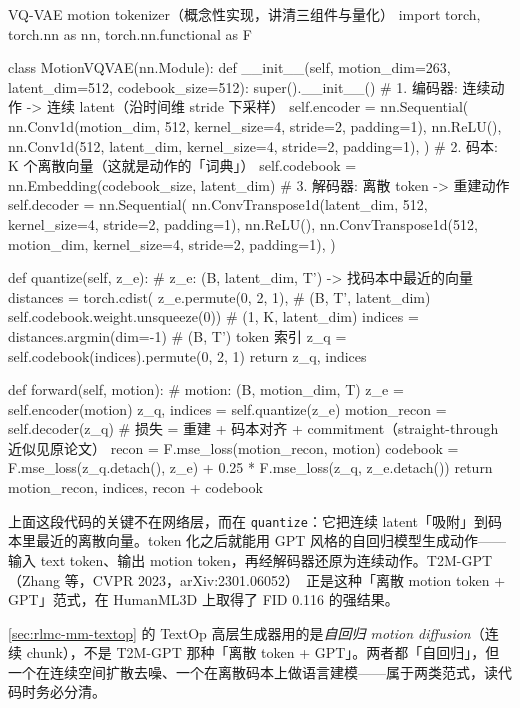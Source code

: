 \begin{codebox}[Python]{VQ-VAE motion tokenizer（概念性实现，讲清三组件与量化）}
import torch, torch.nn as nn, torch.nn.functional as F

class MotionVQVAE(nn.Module):
    def __init__(self, motion_dim=263, latent_dim=512, codebook_size=512):
        super().__init__()
        # 1. 编码器: 连续动作 -> 连续 latent（沿时间维 stride 下采样）
        self.encoder = nn.Sequential(
            nn.Conv1d(motion_dim, 512, kernel_size=4, stride=2, padding=1),
            nn.ReLU(),
            nn.Conv1d(512, latent_dim, kernel_size=4, stride=2, padding=1),
        )
        # 2. 码本: K 个离散向量（这就是动作的「词典」）
        self.codebook = nn.Embedding(codebook_size, latent_dim)
        # 3. 解码器: 离散 token -> 重建动作
        self.decoder = nn.Sequential(
            nn.ConvTranspose1d(latent_dim, 512, kernel_size=4, stride=2, padding=1),
            nn.ReLU(),
            nn.ConvTranspose1d(512, motion_dim, kernel_size=4, stride=2, padding=1),
        )

    def quantize(self, z_e):
        # z_e: (B, latent_dim, T') -> 找码本中最近的向量
        distances = torch.cdist(
            z_e.permute(0, 2, 1),               # (B, T', latent_dim)
            self.codebook.weight.unsqueeze(0))  # (1, K, latent_dim)
        indices = distances.argmin(dim=-1)      # (B, T') token 索引
        z_q = self.codebook(indices).permute(0, 2, 1)
        return z_q, indices

    def forward(self, motion):                  # motion: (B, motion_dim, T)
        z_e = self.encoder(motion)
        z_q, indices = self.quantize(z_e)
        motion_recon = self.decoder(z_q)
        # 损失 = 重建 + 码本对齐 + commitment（straight-through 近似见原论文）
        recon = F.mse_loss(motion_recon, motion)
        codebook = F.mse_loss(z_q.detach(), z_e) + 0.25 * F.mse_loss(z_q, z_e.detach())
        return motion_recon, indices, recon + codebook
\end{codebox}

上面这段代码的关键不在网络层，而在 \verb|quantize|：它把连续 latent「吸附」到码本里最近的离散向量。token 化之后就能用 GPT 风格的自回归模型生成动作——输入 text token、输出 motion token，再经解码器还原为连续动作。T2M-GPT（Zhang 等，CVPR 2023，arXiv:2301.06052）\,\cite{zhang2023t2mgpt} 正是这种「离散 motion token + GPT」范式，在 HumanML3D 上取得了 FID 0.116 的强结果。

\begin{note}
\cref{sec:rlmc-mm-textop} 的 TextOp 高层生成器用的是\emph{自回归 motion diffusion}（连续 chunk），不是 T2M-GPT 那种「离散 token + GPT」。两者都「自回归」，但一个在连续空间扩散去噪、一个在离散码本上做语言建模——属于两类范式，读代码时务必分清。
\end{note}

